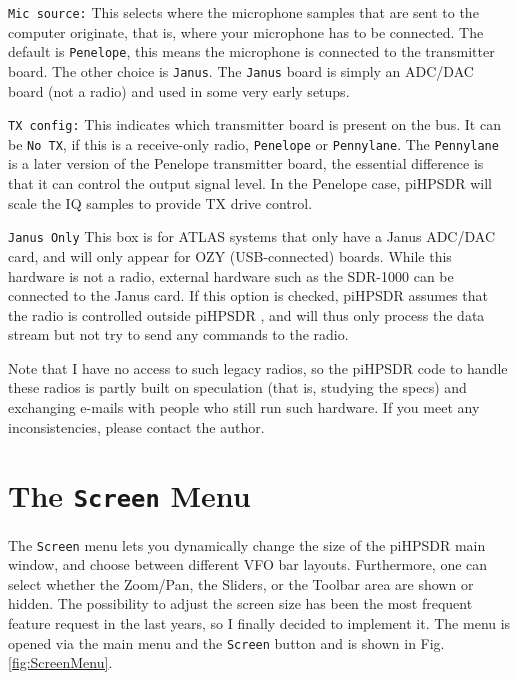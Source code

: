 \documentclass[12pt]{book}
\def\rett#1{\texttt{\color{red}#1}}
\def\bltt#1{\texttt{\color{blue}#1}}
\def\pH{pi\-HPSDR }
\begin{document}
\rett{Mic source:} This selects where the microphone samples that are sent to the computer
originate, that is, where your microphone has to be connected. The default is
\texttt{Penelope}, this means the microphone is connected to the transmitter board. The
other choice is \texttt{Janus}. The \texttt{Janus} board is simply an ADC/DAC board (not
a radio) and used in some very early setups.

\rett{TX config:} This indicates which transmitter board is present on the bus. It can
be \texttt{No TX}, if this is a receive-only radio, \texttt{Penelope} or \texttt{Pennylane}.
The \texttt{Pennylane} is a later version of the Penelope transmitter board, the essential
difference is that it can control the output signal level. In the Penelope case,
\pH will scale the IQ samples to provide TX drive control.

\rett{Janus Only} This box is for ATLAS systems that only have a Janus ADC/DAC card,
and will only appear for OZY (USB-connected) boards. While this hardware is not a radio,
external hardware such as the SDR-1000 can be connected to the Janus card. If this
option is checked, \pH assumes that the radio is controlled outside \pH, and
will thus only process the data stream but not try to send any commands to the radio.

Note that I have no access to such legacy radios, so the \pH code to handle these radios
is partly built on speculation (that is, studying the specs) and exchanging e-mails with
people who still run such hardware. If you meet any inconsistencies, please contact
the author.

\section{The \texttt{Screen} Menu}

The \bltt{Screen} menu lets you dynamically change the size of the \pH main
window, and choose between different VFO bar layouts. Furthermore, one
can select whether the Zoom/Pan, the Sliders, or the Toolbar area are shown or hidden.
The possibility to adjust
the screen size has been the most frequent feature request in the last years,
so I finally decided to implement it. The menu is opened
via the main menu and the \bltt{Screen} button and is shown in Fig. \ref{fig:ScreenMenu}.
\end{document}
